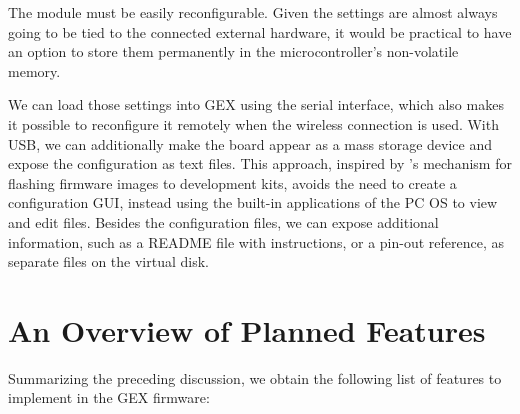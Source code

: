 The module must be easily reconfigurable. Given the settings are almost always going to be tied to the connected external hardware, it would be practical to have an option to store them permanently in the microcontroller's non-volatile memory.

We can load those settings into GEX using the serial interface, which also makes it possible to reconfigure it remotely when the wireless connection is used. With USB, we can additionally make the board appear as a mass storage device and expose the configuration as text files. This approach, inspired by \mbed's mechanism for flashing firmware images to development kits, avoids the need to create a configuration \gls{GUI}, instead using the built-in applications of the \gls{PC} \gls{OS} to view and edit files. Besides the configuration files, we can expose additional information, such as a README file with instructions, or a pin-out reference, as separate files on the virtual disk.

\section{An Overview of Planned Features}

Summarizing the preceding discussion, we obtain the following list of features to implement in the GEX firmware:

